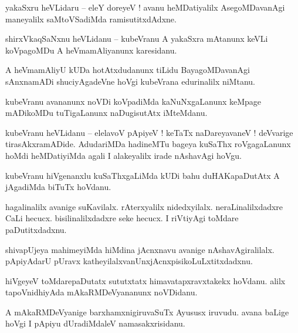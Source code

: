 \documentclass{article}
\begin{document}
\begin{mn}%
yakaSxru heVLidaru -- eleY doreyeV ! avanu heMDatiyalilx AsegoMDavanAgi maneyalilx saMtoVSadiMda 
ramisutitxdAdxne.
\end{mn}

\begin{mn}%
shirxVkaqSaNxnu heVLidanu -- kubeVranu A yakaSxra mAtanunx keVLi koVpagoMDu A heVmamAliyanunx 
karesidanu.
\end{mn}

\begin{mn}%
A heVmamAliyU kUDa hotAtxdudanunx tiLidu BayagoMDavanAgi sAnxnamADi shuciyAgadeVne hoVgi kubeVrana 
edurinalilx niMtanu.
\end{mn}

\begin{mn}%
kubeVranu avananunx noVDi koVpadiMda kaNuNxgaLanunx keMpage mADikoMDu tuTigaLanunx naDugisutAtx 
iMteMdanu.
\end{mn}

\begin{mn}%
kubeVranu heVLidanu -- elelavoV pApiyeV ! keTaTx naDareyavaneV ! deVvarige tirasAkxramADide. 
AdudariMDa hadineMTu bageya kuSaThx roVgagaLanunx hoMdi heMDatiyiMda agali I alakeyalilx irade 
nAshavAgi hoVgu.
\end{mn}

\begin{mn}%
kubeVranu hiVgenanxlu kuSaThxgaLiMda kUDi bahu duHAKapaDutAtx A jAgadiMda biTuTx hoVdanu.
\end{mn}

\begin{mn}%
hagalinalilx avanige suKavilalx. rAterxyalilx nidedxyilalx. neraLinalilxdadxre CaLi hecucx. 
bisilinalilxdadxre seke hecucx. I riVtiyAgi toMdare paDutitxdadxnu.
\end{mn}

\begin{mn}%
shivapUjeya mahimeyiMda hiMdina jAcnxnavu avanige nAshavAgiralilalx. pApiyAdarU pUravx 
katheyilalxvanUnxjAcnxpisikoLuLxtitxdadxnu.
\end{mn}

\begin{mn}%
hiVgeyeV toMdarepaDutatx sututxtatx himavatapxravxtakekx hoVdanu. alilx tapoVnidhiyAda 
mAkaRMDeVyananunx noVDidanu.
\end{mn}

\begin{mn}%
A mAkaRMDeVyanige barxhamxnigiruvaSuTx Ayususx iruvudu. avana baLige hoVgi I pApiyu dUradiMdaleV 
namasakxrisidanu.
\end{mn}
\end{document}
